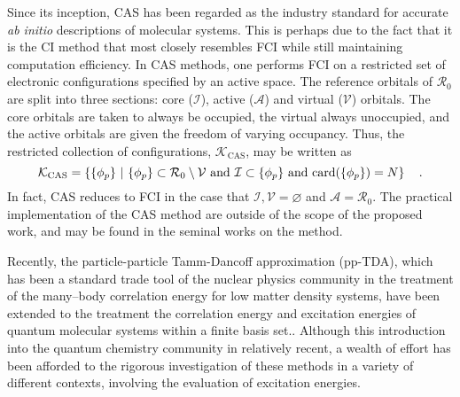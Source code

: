Since its inception, CAS has been regarded as the industry standard for accurate
\emph{ab initio} descriptions of molecular systems. This is perhaps due to the
fact that it is the CI method that most closely resembles FCI while still
maintaining computation efficiency. In CAS methods, one performs FCI on a
restricted set of electronic configurations specified by an active space. The
reference orbitals of $\mathcal{R}_0$ are split into three sections: core 
($\mathcal{I}$), active ($\mathcal{A}$) and virtual ($\mathcal{V}$) orbitals.
The core orbitals are taken to always be occupied, the virtual always
unoccupied, and the active orbitals are given the freedom of varying occupancy.
Thus, the restricted collection of configurations, $\mathcal{K}_\mathrm{CAS}$,
may be written as
\begin{equation}
\mathcal{K}_\mathrm{CAS} = 
\left\lbrace \{ \phi_p \} \text{ }\vert\text{ } 
\{ \phi_p \} \subset \mathcal{R}_0 \setminus \mathcal{V} \text{ and } 
\mathcal{I} \subset \{ \phi_p \} \text{ and }
\mathrm{card}(\{ \phi_p \}) = N \right\rbrace
\quad.
\end{equation}
In fact, CAS reduces to FCI in the case that 
$\mathcal{I},\mathcal{V} = \varnothing$ and $\mathcal{A} = \mathcal{R}_0$.
The practical implementation of the CAS method are outside of the scope of the
proposed work, and may be found in the seminal works on the method.


Recently, the particle-particle Tamm-Dancoff approximation (pp-TDA), which has
been a standard trade tool of the nuclear physics community in the treatment of
the many--body correlation energy for low matter density
systems\cite{SchuckBook_04}, have been extended to the treatment the correlation
energy and excitation energies of quantum molecular systems within a finite
basis set.\cite{Yang13_224105,Yang13_18A522,
Yang13_174110,Yang13_104112,Yang13_030501,Yang09_066403,Bulik13_104113}.
Although this introduction into the quantum chemistry community in relatively
recent, a wealth of effort has been afforded to the rigorous investigation of
these methods in a variety of different contexts, involving the evaluation of
excitation energies\cite{Yang13_224105,Yang13_18A522,Yang13_174110}.
